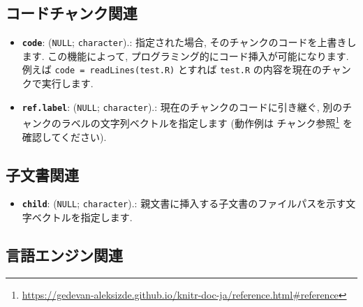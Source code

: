 \documentclass[
  11pt,
  lualatex,
  ja=standard]{bxjsreport}
\providecommand{\tightlist}{%
  \setlength{\itemsep}{0pt}\setlength{\parskip}{0pt}}
\renewcommand{\href}[2]{#2\footnote{\url{#1}}}
\begin{document}
\hypertarget{code-chunk}{%
\subsection{コードチャンク関連}\label{code-chunk}}

\begin{itemize}
\tightlist
\item
  \textbf{\texttt{code}}: (\texttt{NULL}; \texttt{character}).: 指定された場合, そのチャンクのコードを上書きします. この機能によって, プログラミング的にコード挿入が可能になります. 例えば \texttt{code = readLines(\textquotesingle{}test.R\textquotesingle{})} とすれば \texttt{test.R} の内容を現在のチャンクで実行します.
\item
  \textbf{\texttt{ref.label}}: (\texttt{NULL}; \texttt{character}).: 現在のチャンクのコードに引き継ぐ, 別のチャンクのラベルの文字列ベクトルを指定します (動作例は \href{https://gedevan-aleksizde.github.io/knitr-doc-ja/reference.html\#reference}{チャンク参照} を確認してください).
\end{itemize}

\hypertarget{child-document-appendix}{%
\subsection{子文書関連}\label{child-document-appendix}}

\begin{itemize}
\tightlist
\item
  \textbf{\texttt{child}}: (\texttt{NULL}; \texttt{character}).: 親文書に挿入する子文書のファイルパスを示す文字ベクトルを指定します.
\end{itemize}

\hypertarget{engine}{%
\subsection{言語エンジン関連}\label{engine}}
\end{document}
